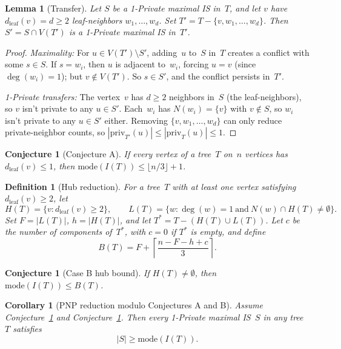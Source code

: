 \documentclass[12pt,oneside]{article}
\newtheorem{lemma}[theorem]{Lemma}
\newtheorem{corollary}[theorem]{Corollary}
\newtheorem{conjecture}[theorem]{Conjecture}
\newtheorem{definition}[theorem]{Definition}
\theoremstyle{remark}
\newcommand{\dleaf}{d_{\mathrm{leaf}}}    %
\newcommand{\priv}{\mathrm{priv}}         %
\begin{document}
\begin{lemma}[Transfer]\label{lem:transfer}
  Let $S$ be a 1-Private maximal IS in~$T$, and let $v$ have $\dleaf(v) = d \ge 2$ leaf-neighbors $w_1, \dotsc, w_d$.
  Set $T' = T - \{v, w_1, \dotsc, w_d\}$.
  Then $S' = S \cap V(T')$ is a 1-Private maximal IS in~$T'$.
\end{lemma}

\begin{proof}
\emph{Maximality:}
For $u \in V(T') \setminus S'$, adding~$u$ to~$S$ in~$T$ creates a conflict with some $s \in S$.
If $s = w_i$, then $u$ is adjacent to~$w_i$, forcing $u = v$ (since $\deg(w_i) = 1$); but $v \notin V(T')$.
So $s \in S'$, and the conflict persists in~$T'$.

\emph{1-Private transfers:}
The vertex~$v$ has $d \ge 2$ neighbors in~$S$ (the leaf-neighbors), so $v$ isn't private to any $u \in S'$.
Each~$w_i$ has $N(w_i) = \{v\}$ with $v \notin S$, so $w_i$ isn't private to any $u \in S'$ either.
Removing $\{v, w_1, \dotsc, w_d\}$ can only reduce private-neighbor counts, so $|\priv_{T'}(u)| \le |\priv_T(u)| \le 1$.
\end{proof}

\begin{conjecture}[Conjecture A]\label{conj:A}
  If every vertex of a tree~$T$ on~$n$ vertices has $\dleaf(v) \le 1$, then $\mathrm{mode}(I(T)) \le \lfloor n/3 \rfloor + 1$.
\end{conjecture}

\begin{definition}[Hub reduction]\label{def:hub-reduction}
For a tree~$T$ with at least one vertex satisfying $\dleaf(v) \ge 2$, let
\[
  H(T)=\{v:\dleaf(v)\ge 2\}, \qquad
  L(T)=\{w:\deg(w)=1\ \text{and}\ N(w)\cap H(T)\ne\emptyset\}.
\]
Set $F=|L(T)|$, $h=|H(T)|$, and let $T^*=T-(H(T)\cup L(T))$.
Let $c$ be the number of components of~$T^*$, with $c=0$ if $T^*$ is empty, and define
\[
  B(T)=F+\left\lceil\frac{n-F-h+c}{3}\right\rceil .
\]
\end{definition}

\begin{conjecture}[Case B hub bound]\label{conj:case-b}
If $H(T)\ne\emptyset$, then $\mathrm{mode}(I(T))\le B(T)$.
\end{conjecture}

\begin{corollary}[PNP reduction modulo Conjectures A and B]\label{cor:pnp-reduction}
Assume Conjecture~\ref{conj:A} and Conjecture~\ref{conj:case-b}.
Then every 1-Private maximal IS~$S$ in any tree~$T$ satisfies
\[
  |S|\ge \mathrm{mode}(I(T)).
\]
\end{corollary}
\end{document}
